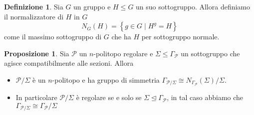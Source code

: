\documentclass[a4paper,12pt]{report}
\newcommand{\p}{\mathcal{P}}
\theoremstyle{plain}
\theoremstyle{definition}
\newtheorem{defin}[teo]{Definizione}
\newtheorem{prop}[teo]{Proposizione}
\begin{document}
\begin{defin}
Sia $G$ un gruppo e $H\leq G$ un suo sottogruppo. Allora definiamo il normalizzatore di $H$ in $G$
\begin{equation*}
N_G(H)=\left\{g\in G\mid H^g=H\right\}
\end{equation*}
come il massimo sottogruppo di $G$ che ha $H$ per sottogruppo normale.
\end{defin}
\begin{prop}
\label{teo:RegularQuotientGroup}
Sia $\p$ un $n$-politopo regolare e $\Sigma\leq\Gamma_\p$ un sottogruppo che agisce compatibilmente alle sezioni. Allora
\begin{itemize}
\item$\p/\Sigma$ \`e un $n$-politopo e ha gruppo di simmetria $\Gamma_{\p/\Sigma}\cong N_{\Gamma_\p}(\Sigma)/\Sigma$.\\
\item In particolare $\p/\Sigma$ \`e regolare se e solo se $\Sigma\unlhd\Gamma_\p$, in tal caso abbiamo che $\Gamma_{\p/\Sigma}\cong\Gamma_\p/\Sigma$
\end{itemize}
\end{prop}
\end{document}
